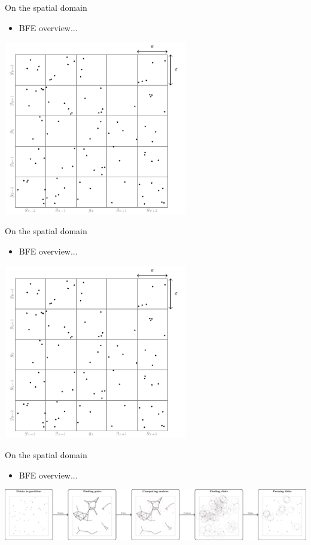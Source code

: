 \documentclass{beamer}
\begin{document}
    \begin{frame}{On the spatial domain}
        \begin{itemize} \item BFE overview... \end{itemize} \vspace{0.5cm}

        \centering
        \includegraphics[page=3,width=0.6\textwidth]{figures/grid}
    \end{frame}

    \begin{frame}{On the spatial domain}
        \begin{itemize} \item BFE overview... \end{itemize} \vspace{0.5cm}

        \centering
        \includegraphics[page=4,width=0.6\textwidth]{figures/grid}
    \end{frame}

    \begin{frame}{On the spatial domain}
        \begin{itemize} \item BFE overview... \end{itemize} \vspace{0.5cm}

        \centering
        \includegraphics[width=\textwidth]{figures/MF_stages/flow}
    \end{frame}
\end{document}
